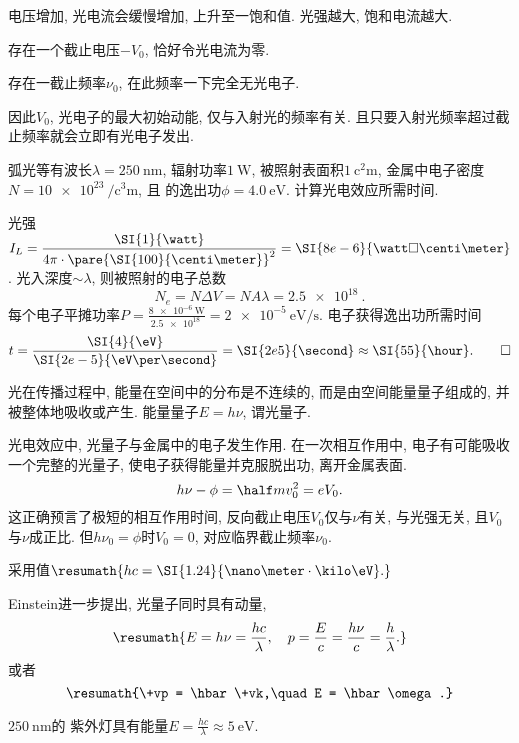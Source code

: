 \documentclass[hidelinks]{ctexart}
\begin{document}
\begin{cenum}
    \item 电压增加, 光电流会缓慢增加, 上升至一饱和值. 光强越大, 饱和电流越大.
    \item 存在一个截止电压$-V_0$, 恰好令光电流为零.
    \item 存在一截止频率$\nu_0$, 在此频率一下完全无光电子.
\end{cenum}
因此$V_0$, 光电子的最大初始动能, 仅与入射光的频率有关. 且只要入射光频率超过截止频率就会立即有光电子发出.
\begin{ex}
    弧光等有波长$\lambda = \SI{250}{\nano\meter}$, 辐射功率$\SI{1}{\watt}$, 被照射表面积$\SI{1}{\square\centi\meter}$, 金属中电子密度$N=\SI{10e23}{\per\cubic\centi\meter}$, 且 的逸出功$\phi = \SI{4.0}{\eV}$. 计算光电效应所需时间.
\end{ex}
\begin{solution}
    光强$\displaystyle I_L = \frac{\SI{1}{\watt}}{4\pi\cdot \pare{\SI{100}{\centi\meter}}^2} = \SI{8e-6}{\watt\square\centi\meter}$. 光入深度$\sim \lambda$, 则被照射的电子总数
    \[ N_e = N\Delta V = NA\lambda = \SI{2.5e18}{}. \]
    每个电子平摊功率$\displaystyle P = \frac{\SI{8e-6}{\watt}}{\SI{2.5e18}{}} = \SI{2e-5}{\eV\per\second}$. 电子获得逸出功所需时间
    \[ t = \frac{\SI{4}{\eV}}{\SI{2e-5}{\eV\per\second}} = \SI{2e5}{\second} \approx \SI{55}{\hour}. \qedhere \]
\end{solution}
光在传播过程中, 能量在空间中的分布是不连续的, 而是由空间能量量子组成的, 并被整体地吸收或产生. 能量量子$E = h\nu$, 谓光量子.
\par
光电效应中, 光量子与金属中的电子发生作用. 在一次相互作用中, 电子有可能吸收一个完整的光量子, 使电子获得能量并克服脱出功, 离开金属表面.
\[ h\nu - \phi = \half mv_0^2 = eV_0. \]
这正确预言了极短的相互作用时间, 反向截止电压$V_0$仅与$\nu$有关, 与光强无关, 且$V_0$与$\nu$成正比. 但$h\nu_0 = \phi$时$V_0 = 0$, 对应临界截止频率$\nu_0$.
\begin{remark}
    采用值$\resumath{hc = \SI{1.24}{\nano\meter\cdot\kilo\eV}.}$
\end{remark}
Einstein进一步提出, 光量子同时具有动量,
\[ \resumath{E = h\nu = \frac{hc}{\lambda},\quad p = \frac{E}{c} = \frac{h\nu}{c} = \frac{h}{\lambda}.} \]
或者
\[ \resumath{\+vp = \hbar \+vk,\quad E = \hbar\omega.} \]
\begin{ex}
    $\SI{250}{\nano\meter}$的 紫外灯具有能量$\displaystyle E = \frac{hc}{\lambda} \approx \SI{5}{\eV}$.
\end{ex}

\end{document}
